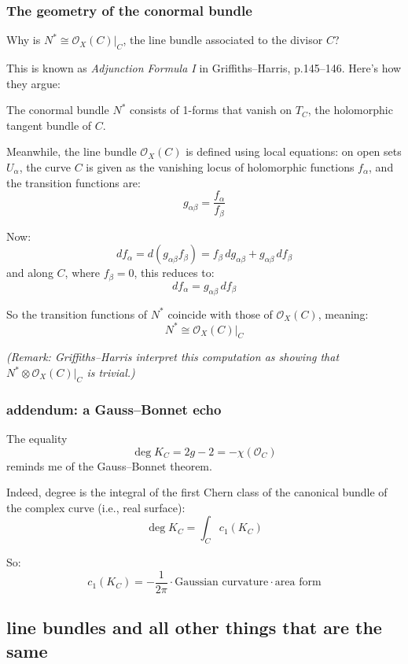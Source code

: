\subsubsection*{The geometry of the conormal bundle}

Why is \( N^* \cong \mathcal{O}_X(C)|_C \), the line bundle associated to the divisor \( C \)?

This is known as \textit{Adjunction Formula I} in Griffiths–Harris, p.145–146. Here’s how they argue:

The conormal bundle \( N^* \) consists of 1-forms that vanish on \( T_C \), the holomorphic tangent bundle of \( C \).

Meanwhile, the line bundle \( \mathcal{O}_X(C) \) is defined using local equations: on open sets \( U_\alpha \), the curve \( C \) is given as the vanishing locus of holomorphic functions \( f_\alpha \), and the transition functions are:
\[
g_{\alpha\beta} = \frac{f_\alpha}{f_\beta}
\]

Now:
\[
df_\alpha = d(g_{\alpha\beta} f_\beta) = f_\beta \, dg_{\alpha\beta} + g_{\alpha\beta} \, df_\beta
\]
and along \( C \), where \( f_\beta = 0 \), this reduces to:
\[
df_\alpha = g_{\alpha\beta} \, df_\beta
\]

So the transition functions of \( N^* \) coincide with those of \( \mathcal{O}_X(C) \), meaning:
\[
N^* \cong \mathcal{O}_X(C)|_C
\]

\emph{(Remark: Griffiths–Harris interpret this computation as showing that \( N^* \otimes \mathcal{O}_X(C)|_C \) is trivial.)}

\subsubsection*{addendum: a Gauss–Bonnet echo}

The equality
\[
\deg K_C = 2g - 2 = -\chi(\mathcal{O}_C)
\]
reminds me of the Gauss–Bonnet theorem.

Indeed, degree is the integral of the first Chern class of the canonical bundle of the complex curve (i.e., real surface):
\[
\deg K_C = \int_C c_1(K_C)
\]

So:
\[
c_1(K_C) = -\frac{1}{2\pi} \cdot \text{Gaussian curvature} \cdot \text{area form}
\]

\subsection{line bundles and all other things that are the same}

